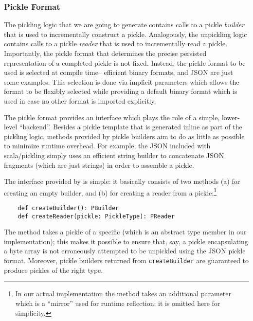 \subsubsection{Pickle Format}
\label{sec:pickleformat}

The pickling logic that we are going to generate contains calls to a pickle
{\em builder} that is used to incrementally construct a pickle. Analogously,
the unpickling logic contains calls to a pickle {\em reader} that is used to
incrementally read a pickle. Importantly, the pickle format that determines
the precise persisted representation of a completed pickle is not fixed.
Instead, the pickle format to be used is selected at compile time-- efficient
binary formats, and JSON are just some examples. This selection is done via
implicit parameters which allows the format to be flexibly selected while
providing a default binary format which is used in case no other format is
imported explicitly.

The pickle format provides an interface which plays the role of a simple,
lower-level ``backend''. Besides a pickle template that is generated inline as
part of the pickling logic, methods provided by pickle builders aim to do as
little as possible to minimize runtime overhead. For example,  the JSON
 included with scala/pickling simply uses an
efficient string builder to concatenate JSON fragments (which are just
strings) in order to assemble a pickle.

The interface provided by  is simple: it basically consists
of two methods (a) for creating an empty builder, and (b) for creating a
reader from a pickle:\footnote{In our actual implementation the
 method takes an additional parameter which is a ``mirror''
used for runtime reflection; it is omitted here for simplicity.}

\begin{lstlisting}
    def createBuilder(): PBuilder
    def createReader(pickle: PickleType): PReader
\end{lstlisting}

The  method takes a pickle of a specific 
(which is an abstract type member in our implementation); this makes it
possible to ensure that, say, a pickle encapsulating a byte array is not
erroneously attempted to be unpickled using the JSON pickle format. Moreover,
pickle builders returned from \verb|createBuilder| are guaranteed to produce
pickles of the right type.

